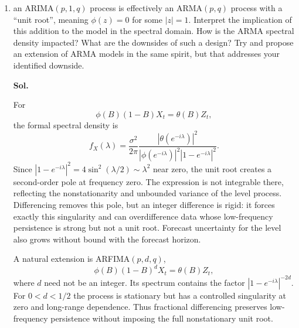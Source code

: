 \documentclass[lang=en,11pt,a4paper,citestyle =authoryear]{elegantpaper}
\begin{document}
\begin{enumerate}[label=\arabic*.,leftmargin=*]
\item[$4^*$] an ARIMA$(p,1,q)$ process is effectively an ARMA$(p,q)$ process with a ``unit root'', meaning $\phi(z)=0$ for some $|z|=1$. Interpret the implication of this addition to the model in the spectral domain. How is the ARMA spectral density impacted? What are the downsides of such a design? Try and propose an extension of ARMA models in the same spirit, but that addresses your identified downside.
\par\vspace{0.5em}\textbf{Sol.}\par
For
\[
\phi(B)(1-B)X_t=\theta(B)Z_t,
\]
the formal spectral density is
\[
f_X(\lambda)=\frac{\sigma^2}{2\pi}
\frac{|\theta(e^{-i\lambda})|^2}
{|\phi(e^{-i\lambda})|^2|1-e^{-i\lambda}|^2}.
\]
Since $|1-e^{-i\lambda}|^2=4\sin^2(\lambda/2)\sim\lambda^2$ near zero,
the unit root creates a second-order pole at frequency zero. The expression is
not integrable there, reflecting the nonstationarity and unbounded variance of
the level process. Differencing removes this pole, but an integer difference
is rigid: it forces exactly this singularity and can overdifference data whose
low-frequency persistence is strong but not a unit root. Forecast uncertainty
for the level also grows without bound with the forecast horizon.

A natural extension is ARFIMA$(p,d,q)$,
\[
\phi(B)(1-B)^dX_t=\theta(B)Z_t,
\]
where $d$ need not be an integer. Its spectrum contains the factor
$|1-e^{-i\lambda}|^{-2d}$. For $0<d<1/2$ the process is stationary but has a
controlled singularity at zero and long-range dependence. Thus fractional
differencing preserves low-frequency persistence without imposing the full
nonstationary unit root.
\end{enumerate}

\newpage
\end{document}
